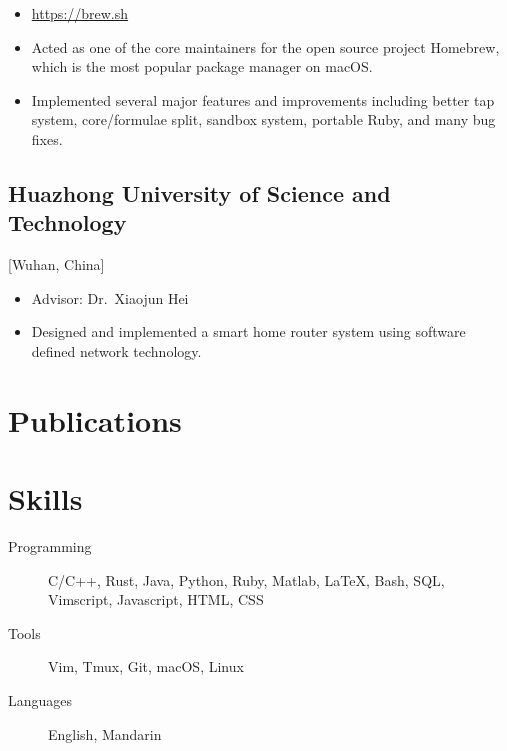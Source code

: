 \documentclass{mycv}
\begin{document}
\begin{itemize}
  \item \url{https://brew.sh}
  \item Acted as one of the core maintainers for the open source project Homebrew, which is the most popular package manager on macOS\@.
  \item Implemented several major features and improvements including better tap system, core/formulae split, sandbox system, portable Ruby, and many bug fixes.
\end{itemize}

\subsection{Huazhong University of Science and Technology}[Wuhan, China]
\begin{positions}
\end{positions}

\begin{itemize}
  \item Advisor: Dr.~Xiaojun Hei
  \item Designed and implemented a smart home router system using software defined network technology.
\end{itemize}

\section{Publications}%

\section{Skills}
\begin{description}
  \item[Programming]
        \parbox[t]{\linegoal}{
          \strut%
          C/C++, Rust, Java, Python, Ruby, Matlab, \LaTeX, Bash, SQL, Vimscript, Javascript, HTML, CSS
          \strut%
        }
  \item[Tools] Vim, Tmux, Git, macOS, Linux
  \item[Languages] English, Mandarin
\end{description}
\end{document}
